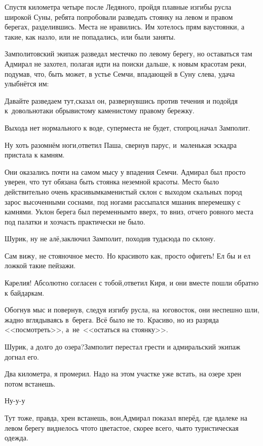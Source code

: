Спустя километра четыре после Ледяного, пройдя плавные изгибы русла широкой Суны, ребята попробовали разведать стоянку на левом и правом берегах, разделившись. Места не нравились. Им хотелось прям вау\sdash стоянки, а такие, как назло, или не попадались, или были заняты.

Замполитовский экипаж разведал местечко по левому берегу, но оставаться там Адмирал не захотел, полагая идти на поиски дальше, к новым красотам реки, подумав, что, быть может, в устье Семчи, впадающей в Суну слева, удача улыбнётся им:

\diagdash Давайте разведаем тут,\mdash сказал он, развернувшись против течения и подойдя к~довольно\sdash таки обрывистому каменистому правому бережку.

\diagdash Выхода нет нормального к воде, супер\sdash места не будет, стопроц,\mdash начал Замполит.

\diagdash Ну хоть разомнём ноги,\mdash ответил Паша, свернув парус, и~маленькая эскадра пристала к камням.

Они оказались почти на самом мысу у впадения Семчи. Адмирал был просто уверен, что тут обязана быть стоянка неземной красоты. Место было действительно очень красивым\mdash каменистый склон с выходом скальных пород зарос высоченными соснами, под ногами рассыпался мшаник вперемешку с камнями. Уклон берега был переменным\mdash то вверх, то вниз, отчего ровного места под палатки и хозчасть практически не было.

\diagdash Шурик, ну не алё,\mdash заключил Замполит, походив туда\sdash сюда по склону.

\diagdash Сам вижу, не стояночное место. Но красиво\sdash то как, просто офигеть! Ел бы и ел ложкой такие пейзажи.

\diagdash Карелия! Абсолютно согласен с тобой,\mdash ответил Киря, и они вместе пошли обратно к байдаркам.

Обогнув мыс и повернув, следуя изгибу русла, на~юго\sdash восток, они неспешно шли, жадно вглядываясь в~берега. Всё было не то. Красиво, но из разряда <<посмотреть>>, а~не~<<остаться на стоянку>>.

\diagdash Шурик, а долго до озера?\mdash Замполит перестал грести и адмиральский экипаж догнал его.

\diagdash Два километра, я промерил. Надо на этом участке уже встать, на озере хрен потом встанешь.

\diagdash Ну-у-у\myldots{}

\diagdash Тут тоже, правда, хрен встанешь, вон,\mdash Адмирал показал вперёд, где вдалеке на левом берегу виднелось что\sdash то цветастое, скорее всего, чья\sdash то туристическая одежда. 

